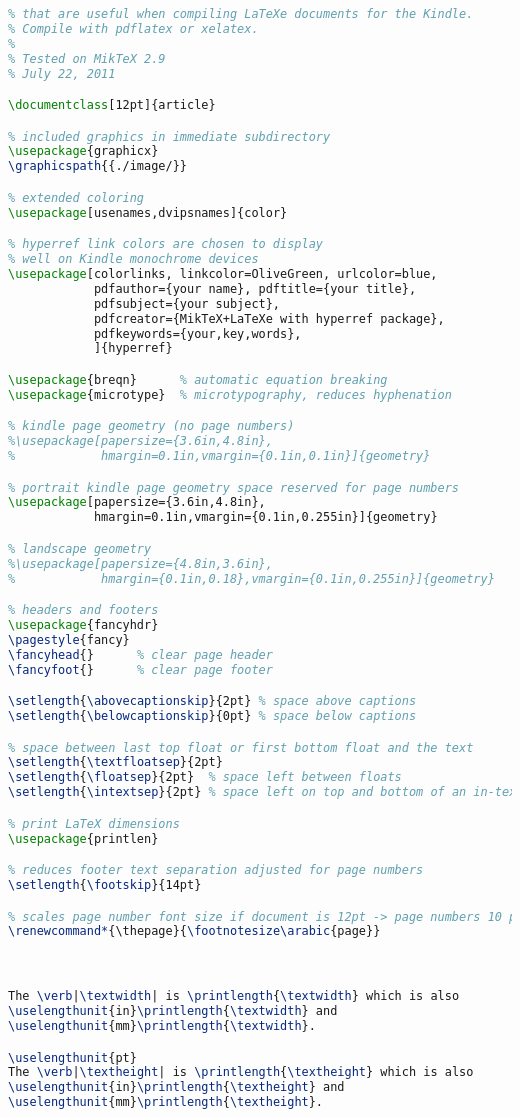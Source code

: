\lstset{style=smallersource}
\begin{lstlisting}[language=TeX,frame=single,framerule=0pt,label=lst:scr1543X0]
% A simple test document that displays some packages and settings
% that are useful when compiling LaTeXe documents for the Kindle.
% Compile with pdflatex or xelatex.
%
% Tested on MikTeX 2.9
% July 22, 2011

\documentclass[12pt]{article}

% included graphics in immediate subdirectory
\usepackage{graphicx}
\graphicspath{{./image/}}

% extended coloring
\usepackage[usenames,dvipsnames]{color}

% hyperref link colors are chosen to display
% well on Kindle monochrome devices
\usepackage[colorlinks, linkcolor=OliveGreen, urlcolor=blue,
            pdfauthor={your name}, pdftitle={your title},
            pdfsubject={your subject},
            pdfcreator={MikTeX+LaTeXe with hyperref package},
            pdfkeywords={your,key,words},
            ]{hyperref}

\usepackage{breqn}      % automatic equation breaking
\usepackage{microtype}  % microtypography, reduces hyphenation

% kindle page geometry (no page numbers)
%\usepackage[papersize={3.6in,4.8in},
%            hmargin=0.1in,vmargin={0.1in,0.1in}]{geometry}

% portrait kindle page geometry space reserved for page numbers
\usepackage[papersize={3.6in,4.8in},
            hmargin=0.1in,vmargin={0.1in,0.255in}]{geometry}

% landscape geometry
%\usepackage[papersize={4.8in,3.6in},
%            hmargin={0.1in,0.18},vmargin={0.1in,0.255in}]{geometry}

% headers and footers
\usepackage{fancyhdr}
\pagestyle{fancy}
\fancyhead{}      % clear page header
\fancyfoot{}      % clear page footer

\setlength{\abovecaptionskip}{2pt} % space above captions
\setlength{\belowcaptionskip}{0pt} % space below captions

% space between last top float or first bottom float and the text
\setlength{\textfloatsep}{2pt} 
\setlength{\floatsep}{2pt}  % space left between floats
\setlength{\intextsep}{2pt} % space left on top and bottom of an in-text float

% print LaTeX dimensions
\usepackage{printlen}

% reduces footer text separation adjusted for page numbers
\setlength{\footskip}{14pt}

% scales page number font size if document is 12pt -> page numbers 10 pt
\renewcommand*{\thepage}{\footnotesize\arabic{page}}



The \verb|\textwidth| is \printlength{\textwidth} which is also
\uselengthunit{in}\printlength{\textwidth} and
\uselengthunit{mm}\printlength{\textwidth}.

\uselengthunit{pt}
The \verb|\textheight| is \printlength{\textheight} which is also
\uselengthunit{in}\printlength{\textheight} and
\uselengthunit{mm}\printlength{\textheight}.


\end{lstlisting}
